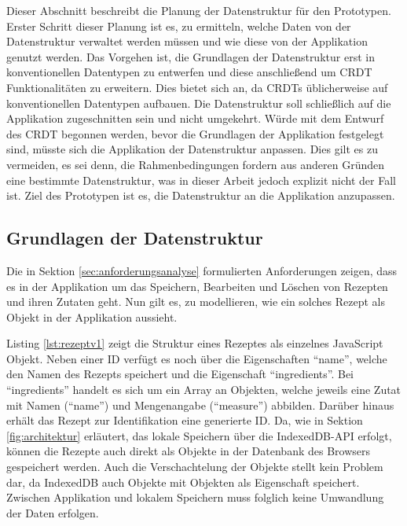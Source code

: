 \documentclass[a4paper, 12pt]{scrreprt}
\begin{document}
Dieser Abschnitt beschreibt die Planung der Datenstruktur für den Prototypen. Erster Schritt dieser Planung ist es, zu ermitteln, welche Daten von der Datenstruktur verwaltet werden müssen und wie diese von der Applikation genutzt werden. Das Vorgehen ist, die Grundlagen der Datenstruktur erst in konventionellen Datentypen zu entwerfen und diese anschließend um CRDT Funktionalitäten zu erweitern. Dies bietet sich an, da \acp{CRDT} üblicherweise auf konventionellen Datentypen aufbauen. Die Datenstruktur soll schließlich auf die Applikation zugeschnitten sein und nicht umgekehrt. Würde mit dem Entwurf des CRDT begonnen werden, bevor die Grundlagen der Applikation festgelegt sind, müsste sich die Applikation der Datenstruktur anpassen. Dies gilt es zu vermeiden, es sei denn, die Rahmenbedingungen fordern aus anderen Gründen eine bestimmte Datenstruktur, was in dieser Arbeit jedoch explizit nicht der Fall ist. Ziel des Prototypen ist es, die Datenstruktur an die Applikation anzupassen. 

\subsection{Grundlagen der Datenstruktur}

Die in Sektion \ref{sec:anforderungsanalyse} formulierten Anforderungen zeigen, dass es in der Applikation um das Speichern, Bearbeiten und Löschen von Rezepten und ihren Zutaten geht. Nun gilt es, zu modellieren, wie ein solches Rezept als Objekt in der Applikation aussieht. 

Listing \ref{lst:rezeptv1} zeigt die Struktur eines Rezeptes als einzelnes JavaScript Objekt. Neben einer ID verfügt es noch über die Eigenschaften \enquote{name}, welche den Namen des Rezepts speichert und die Eigenschaft \enquote{ingredients}. Bei \enquote{ingredients} handelt es sich um ein Array an Objekten, welche jeweils eine Zutat mit Namen (\enquote{name}) und Mengenangabe (\enquote{measure}) abbilden. Darüber hinaus erhält das Rezept zur Identifikation eine generierte ID. Da, wie in Sektion \ref{fig:architektur} erläutert, das lokale Speichern über die IndexedDB-API erfolgt, können die Rezepte auch direkt als Objekte in der Datenbank des Browsers gespeichert werden. Auch die Verschachtelung der Objekte stellt kein Problem dar, da IndexedDB auch Objekte mit Objekten als Eigenschaft speichert. Zwischen Applikation und lokalem Speichern muss folglich keine Umwandlung der Daten erfolgen.

\end{document}
